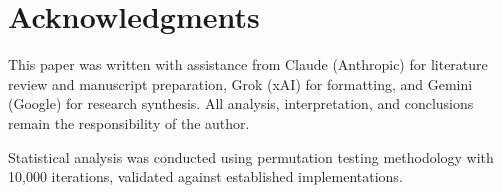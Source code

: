 \documentclass[11pt,a4paper]{article}
\begin{document}
\section*{Acknowledgments}
This paper was written with assistance from Claude (Anthropic) for literature review and manuscript preparation, Grok (xAI) for formatting, and Gemini (Google) for research synthesis.
All analysis, interpretation, and conclusions remain the responsibility of the author.

Statistical analysis was conducted using permutation testing methodology with 10,000 iterations, validated against established implementations.
\end{document}
